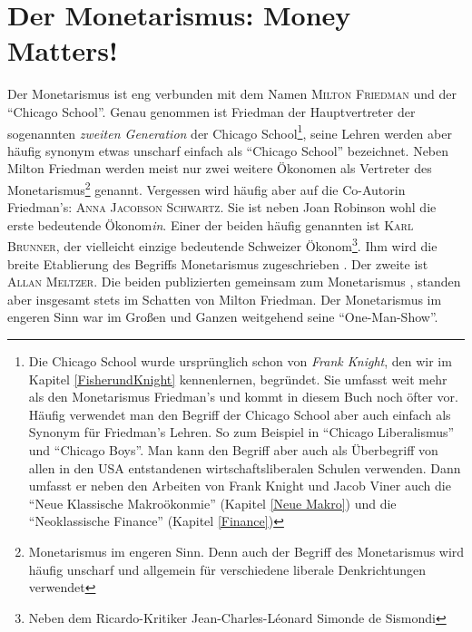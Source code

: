 %
%
%

\chapter{Der Monetarismus: Money Matters!}
\label{Monetarismus}

Der Monetarismus ist eng verbunden mit dem Namen \textsc{Milton Friedman} und der "`Chicago School"'. Genau genommen ist Friedman der Hauptvertreter der sogenannten \textit{zweiten Generation} der Chicago School\footnote{Die Chicago School wurde ursprünglich schon von \textit{Frank Knight}, den wir im Kapitel \ref{FisherundKnight} kennenlernen, begründet. Sie umfasst weit mehr als den Monetarismus Friedman's und kommt in diesem Buch noch öfter vor. Häufig verwendet man den Begriff der Chicago School aber auch einfach als Synonym für Friedman's Lehren. So zum Beispiel in "`Chicago Liberalismus"' und "`Chicago Boys"'. Man kann den Begriff aber auch als Überbegriff von allen in den USA entstandenen wirtschaftsliberalen Schulen verwenden. Dann umfasst er neben den Arbeiten von Frank Knight und Jacob Viner auch die "`Neue Klassische Makroökonmie"' (Kapitel \ref{Neue Makro}) und die "`Neoklassische Finance"' (Kapitel \ref{Finance})}, seine Lehren werden aber häufig synonym etwas unscharf einfach als "`Chicago School"' bezeichnet. Neben Milton Friedman werden meist nur zwei weitere Ökonomen als Vertreter des Monetarismus\footnote{Monetarismus im engeren Sinn. Denn auch der Begriff des Monetarismus wird häufig unscharf und allgemein für verschiedene liberale Denkrichtungen verwendet} genannt. Vergessen wird häufig aber auf die Co-Autorin Friedman's: \textsc{Anna Jacobson Schwartz}. Sie ist neben Joan Robinson wohl die erste bedeutende Ökonom\textit{in}. Einer der beiden häufig genannten ist \textsc{Karl Brunner}, der vielleicht einzige bedeutende Schweizer Ökonom\footnote{Neben dem Ricardo-Kritiker Jean-Charles-Léonard Simonde de Sismondi}. Ihm wird die breite Etablierung des Begriffs Monetarismus zugeschrieben \parencite{Pierenkemper2012, Brunner1968}. Der zweite ist \textsc{Allan Meltzer}. Die beiden publizierten gemeinsam zum Monetarismus \parencite{Meltzer1971}, standen aber insgesamt stets im Schatten von Milton Friedman. Der Monetarismus im engeren Sinn war im Großen und Ganzen weitgehend seine "`One-Man-Show"'. 

